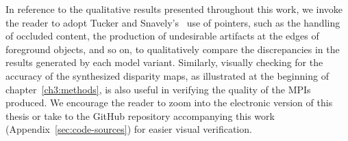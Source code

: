 In reference to the qualitative results presented throughout this work, we invoke the reader to adopt Tucker and Snavely's~\cite{single_view_mpi} use of pointers, such as the handling of occluded content, the production of undesirable artifacts at the edges of foreground objects, and so on, to qualitatively compare the discrepancies in the results generated by each model variant. Similarly, visually checking for the accuracy of the synthesized disparity maps, as illustrated at the beginning of chapter~\ref{ch3:methods}, is also useful in verifying the quality of the MPIs produced. We encourage the reader to zoom into the electronic version of this thesis or take to the GitHub repository accompanying this work (Appendix~\ref{sec:code-sources}) for easier visual verification.